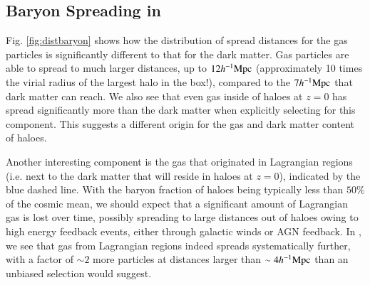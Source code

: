 \subsection{Baryon Spreading in \simba{}}

Fig. \ref{fig:distbaryon} shows how the distribution of spread distances
for the gas particles is significantly different to that for the dark matter.
Gas particles are able to spread to much larger distances, up to $12h^{-1}{\rm Mpc}{}$
(approximately 10 times the virial radius of the largest halo in the box!),
compared to the $7h^{-1}{\rm Mpc}{}$ that dark matter can reach. We also see that even
gas inside of haloes at $z=0$ has spread significantly more than the dark
matter when explicitly selecting for this component. This suggests a
different origin for the gas and dark matter content of haloes.

Another interesting component is the gas that originated in Lagrangian
regions (i.e. next to the dark matter that will reside in haloes at $z=0$),
indicated by the blue dashed line. With the baryon fraction of haloes being
typically less than $50\%$ of the cosmic mean, we should expect that a
significant amount of Lagrangian gas is lost over time, possibly spreading to
large distances out of haloes owing to high energy feedback events, either
through galactic winds or AGN feedback. In \simba{}, we see that gas from
Lagrangian regions indeed spreads systematically further, with a factor of
$\sim 2$ more particles at distances larger than $\sim 4 h^{-1}{\rm Mpc}{}$ than an
unbiased selection would suggest.

